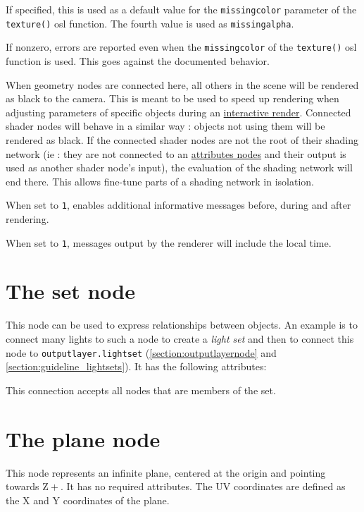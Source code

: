 \documentclass[oneside,ebook]{memoir}
\newcommand{\paramlistitemTN}[2]{\item[#2\textcolor{lightgray}{\dotfill}#1]}
\newcommand{\paramlistitemTND}[3]{\paramlistitemTN{#1 {\rmfamily({\ttfamily#3})}}{#2}}
\begin{document}
\begin{paramlist}
If specified, this is used as a default value for the \lstinline|missingcolor| parameter of the \lstinline|texture()| osl function.
The fourth value is used as \lstinline|missingalpha|.
\paramlistitemTND{int}{texture.missingcolorerrors}{0}
If nonzero, errors are reported even when the \lstinline|missingcolor| of the \lstinline|texture()| osl function is used.
This goes against the documented behavior.
\paramlistitemTN{<connection>}{exclusiveshading}
When geometry nodes are connected here, all others in the scene will be rendered as black to the camera.
This is meant to be used to speed up rendering when adjusting parameters of specific objects during an \hyperref[interactive render]{interactive render}.
Connected shader nodes will behave in a similar way : objects not using them will be rendered as black.
If the connected shader nodes are not the root of their shading network (ie : they are not connected to an \hyperref[section:attributesnode]{attributes nodes} and their output is used as another shader node's input), the evaluation of the shading network will end there.
This allows fine-tune parts of a shading network in isolation.
\paramlistitemTND{int}{verbose}{0}
When set to \lstinline|1|, enables additional informative messages before, during and after rendering.
\paramlistitemTND{int}{messages.timestamp}{0}
When set to \lstinline|1|, messages output by the renderer will include the local time.
\end{paramlist}


\section{The set node}
\label{section:setnode}
This node can be used to express relationships between objects. An example is to connect many lights to such a node to create a \emph{light set}  and then to connect this node to \lstinline|outputlayer.lightset| (\autoref{section:outputlayernode} and \autoref{section:guideline_lightsets}). It has the following attributes:
\begin{paramlist}
\paramlistitemTN{<connection>}{members}
This connection accepts all nodes that are members of the set.
\end{paramlist}

\section{The plane node}
\label{section:planenode}
This node represents an infinite plane, centered at the origin and pointing
towards \(\mathrm{Z+}\). It has no required attributes. The UV coordinates are
defined as the X and Y coordinates of the plane.
\end{document}
